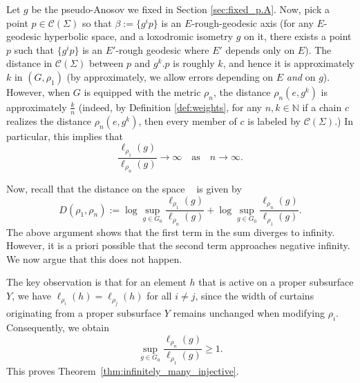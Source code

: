 \documentclass{amsart}
\numberwithin{thm}{section}
\numberwithin{figure}{section}
\theoremstyle{definition}
\theoremstyle{definition}
\theoremstyle{remark}
\numberwithin{equation}{section}
\DeclareMathOperator{\DDGS}{\mathcal{D}_{s}(G)}
\theoremstyle{plain}
\begin{document}
Let $g$ be the pseudo-Anosov we fixed in Section \ref{sec:fixed_p.A}. Now, pick a point $p \in \mathcal{C}(\Sigma)$ so that $\beta:=\{g^ip\}$ is an $E$-rough-geodesic axis (for any $E$-geodesic hyperbolic space, and a loxodromic isometry $g$ on it, there exists a point $p$ such that $\{g^ip\}$ is an $E'$-rough geodesic where $E'$ depends only on $E$). The distance in $\mathcal{C}(\Sigma)$ between $p$ and $g^k.p$ is roughly $k$, and hence it is approximately $k$ in $(G, \rho_1)$ (by approximately, we allow errors depending on $E$ \emph{and} on $g$). However, when $G$ is equipped with the metric $\rho_n$, the distance $\rho_n(e, g^k)$ is approximately $\frac{k}{n}$ (indeed, by Definition \ref{def:weights}, for any $n,k \in \mathbb{N}$ if a chain $c$ realizes the distance $\rho_n(e,g^k)$, then every member of $c$ is labeled by $\mathcal{C}(\Sigma).$) In particular, this implies that 
\[
\frac{\ell_{\rho_1}(g)}{\ell_{\rho_n}(g)} \to \infty \quad \text{as} \quad n \to \infty.
\]

Now, recall that the distance on the space $\DDGS$ is given by
\[
D(\rho_1, \rho_n) := \log \sup_{g \in G_0} \frac{\ell_{\rho_1}(g)}{\ell_{\rho_n}(g)} + \log \sup_{g \in G_0} \frac{\ell_{\rho_n}(g)}{\ell_{\rho_1}(g)}.
\]
The above argument shows that the first term in the sum diverges to infinity. However, it is a priori possible that the second term approaches negative infinity. We now argue that this does not happen.

The key observation is that for an element $h$ that is active on a proper subsurface $Y$, we have $\ell_{\rho_i}(h) = \ell_{\rho_j}(h)$ for all $i \neq j$, since the width of curtains originating from a proper subsurface $Y$ remains unchanged when modifying $\rho_i$. Consequently, we obtain 
\[
\sup_{g \in G_0} \frac{\ell_{\rho_n}(g)}{\ell_{\rho_1}(g)} \geq 1.
\]
This proves Theorem~\ref{thm:infinitely_many_injective}.

  
    
	
\end{document}
